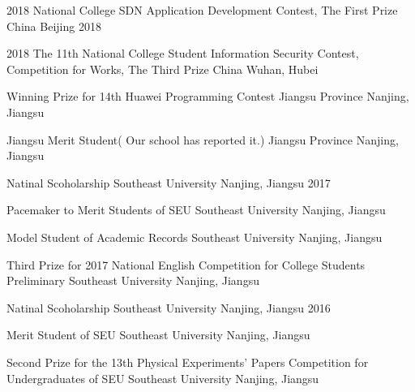 \vspace{-6.0mm}


\vspace{-1.5mm}
\begin{cvhonors}
\cvhonor
{2018 National College SDN Application Development Contest, The First Prize} %
{China} %
{Beijing} %
{2018} %

\cvhonor
{2018 The 11th National College Student Information Security Contest, Competition for Works, The Third Prize} %
{China} %
{Wuhan, Hubei} %
{} %

\cvhonor
{Winning Prize for 14th Huawei Programming Contest} %
{Jiangsu Province} %
{Nanjing, Jiangsu} %
{} %

\cvhonor
{Jiangsu Merit Student( Our school has reported it.)} %
{Jiangsu Province} %
{Nanjing, Jiangsu} %
{} %

\cvhonor
{Natinal Scoholarship} %
{Southeast University} %
{Nanjing, Jiangsu} %
{2017} %

\cvhonor
{Pacemaker to Merit Students of SEU } %
{Southeast University} %
{Nanjing, Jiangsu} %
{} %


\cvhonor
{Model Student of Academic Records} %
{Southeast University} %
{Nanjing, Jiangsu} %
{} %

\cvhonor
{Third Prize for 2017 National English Competition for College Students Preliminary}
{Southeast University}
{Nanjing, Jiangsu}
{}


\cvhonor
{Natinal Scoholarship} %
{Southeast University} %
{Nanjing, Jiangsu} %
{2016} %


\cvhonor
{Merit Student of SEU} %
{Southeast University} %
{Nanjing, Jiangsu} %
{} %


\cvhonor
{Second Prize for the 13th Physical Experiments' Papers Competition for Undergraduates of SEU}
{Southeast University}
{Nanjing, Jiangsu}
{}
\end{cvhonors}